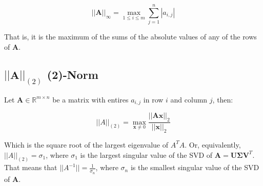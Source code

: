 \begin{equation}
||\mathbf{A}||_\infty = \max_{1\leq i \leq m} \sum^n_{j=1} |a_{i,j} |
\end{equation}

That is, it is the maximum of the sums of the absolute values of any of the rows of $\mathbf{A}$.

\subsection{$||\mathbf{A}||_{(2)}$ (2)-Norm}
\label{2norm}

Let $\mathbf{A} \in \mathbb{R}^{m\times n}$ be a matrix with entires $a_{i,j}$ in row $i$ and column $j$, then:

\begin{equation}
||A||_(2) = \max_{\mathbf{x}\neq 0} \frac{||\mathbf{Ax}||_2}{||\mathbf{x}||_2}
\end{equation}

Which is the square root of the largest eigenvalue of $A^T A$. Or, equivalently, $||A||_{(2)} = \sigma_1$, where $\sigma_1$ is the largest singular value of the SVD of $\mathbf{A} = \mathbf{U\Sigma V}^T$. That means that $||A^{-1}|| = \frac{1}{\sigma_n}$, where $\sigma_n$ is the smallest singular value of the SVD of $\mathbf{A}$.

